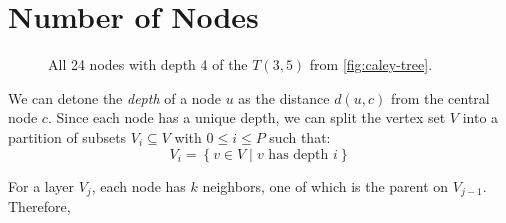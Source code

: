 \section{Number of Nodes}

    \begin{figure}[H]
        \centering
        

        \caption{All 24 nodes with depth 4 of the $T(3, 5)$ from \cref{fig:caley-tree}.}
    \end{figure}

    We can detone the \textit{depth} of a node $u$ as the distance $d(u,c)$ from the central node $c$. Since each node has a unique depth, we can split the vertex set $V$ into a partition of subsets $V_i \subseteq V$ with $0 \leq i \leq P$ such that:
    \[
        V_i = \left\{v \in V \mid \text{$v$ has depth $i$}\right\}
    \]

    For a layer $V_j$, each node has $k$ neighbors, one of which is the parent on $V_{j-1}$. Therefore,

